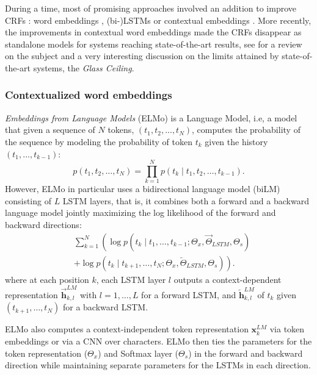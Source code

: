During a time, most of promising approaches involved an addition to improve CRFs : word embeddings \cite{passos-etal-2014-lexicon}, (bi-)LSTMs \cite{lample-etal-2016-neural} %
or contextual embeddings \cite{peters-etal-2018-deep}.
More recently, the improvements in contextual word embeddings made the CRFs disappear as standalone models for systems reaching state-of-the-art results, see \cite{stanislawek-etal-2019-named} for a review on the subject and a very interesting discussion on the limits attained by state-of-the-art systems, the \textit{Glass Ceiling}.

\subsubsection{Contextualized word embeddings}

\emph{Embeddings from Language Models} (ELMo) \cite{peters-etal-2018-deep} is a Language Model, i.e, a model that given a sequence of $N$ tokens, $(t_1, t_2, ..., t_N)$, computes the probability of the sequence
by modeling the probability of token $t_k$ given the history $(t_1, ..., t_{k-1})$:
\[
    p(t_1, t_2, \ldots, t_N) = \prod_{k=1}^N p({t_k} \mid t_1, t_2, \ldots, t_{k-1}).
\]
However, ELMo in particular uses a bidirectional language model (biLM) consisting of $L$ LSTM layers, that is, it combines both a forward and a backward language model jointly maximizing the log likelihood of the forward and backward directions:
\begin{align*}
     & \sum_{k=1}^N \left( \right. \log p({t_k} \mid t_1, \ldots, t_{k-1}; \Theta_x, \overrightarrow{\Theta}_{LSTM}, \Theta_s) \\
     & + \log p({t_k} \mid t_{k+1}, \ldots, t_{N}; \Theta_x, \overleftarrow{\Theta}_{LSTM}, \Theta_s)
    \left. \right).
\end{align*}
where at each position $k$, each LSTM layer $l$ outputs a context-dependent representation $\overrightarrow{\mathbf{h}}^{LM}_{k,l}$ with $l=1, \ldots, L$ for a forward LSTM, and $\overleftarrow{\mathbf{h}}^{LM}_{k,l}$ of $t_k$ given $(t_{k+1}, \ldots, t_N)$ for a backward LSTM.

ELMo also computes a context-independent token representation $\mathbf{x}^{LM}_{k}$ via token embeddings or via a CNN over characters. ELMo then ties the parameters for the token representation ($\Theta_x$) and Softmax layer ($\Theta_s$) in the forward and backward direction while maintaining separate parameters for the LSTMs in each direction.

